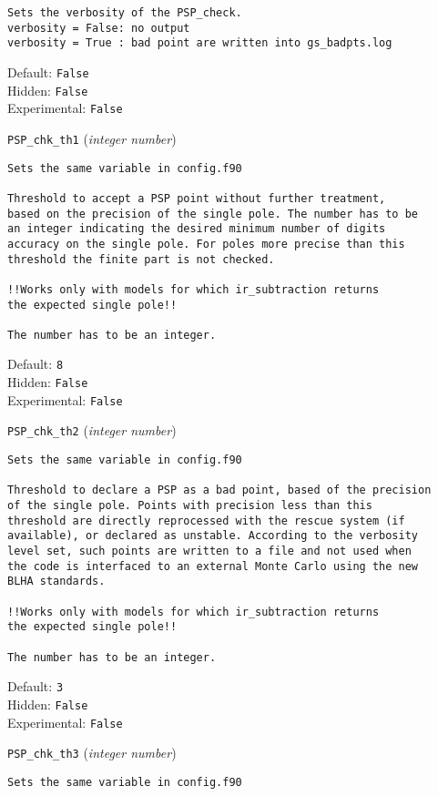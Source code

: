\begin{basedescript}{\desclabelstyle{\pushlabel}}
\begin{verbatim}
Sets the verbosity of the PSP_check.
verbosity = False: no output
verbosity = True : bad point are written into gs_badpts.log
\end{verbatim}
Default: \verb|False|
\\Hidden: \verb|False|
\\Experimental: \verb|False|
\\\item[\colorbox{gray!30}{\texttt{PSP\_chk\_th1}}] (\textit{integer number})
\begin{verbatim}
Sets the same variable in config.f90

Threshold to accept a PSP point without further treatment,
based on the precision of the single pole. The number has to be
an integer indicating the desired minimum number of digits
accuracy on the single pole. For poles more precise than this
threshold the finite part is not checked.

!!Works only with models for which ir_subtraction returns
the expected single pole!!

The number has to be an integer.
\end{verbatim}
Default: \verb|8|
\\Hidden: \verb|False|
\\Experimental: \verb|False|
\\\item[\colorbox{gray!30}{\texttt{PSP\_chk\_th2}}] (\textit{integer number})
\begin{verbatim}
Sets the same variable in config.f90

Threshold to declare a PSP as a bad point, based of the precision
of the single pole. Points with precision less than this
threshold are directly reprocessed with the rescue system (if
available), or declared as unstable. According to the verbosity
level set, such points are written to a file and not used when
the code is interfaced to an external Monte Carlo using the new
BLHA standards.

!!Works only with models for which ir_subtraction returns
the expected single pole!!

The number has to be an integer.
\end{verbatim}
Default: \verb|3|
\\Hidden: \verb|False|
\\Experimental: \verb|False|
\\\item[\colorbox{gray!30}{\texttt{PSP\_chk\_th3}}] (\textit{integer number})
\begin{verbatim}
Sets the same variable in config.f90


\end{verbatim}
\end{basedescript}
